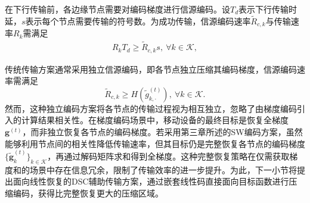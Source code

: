 在下行传输前，各边缘节点需要对编码梯度进行信源编码。设$T_d$表示下行传输时延，$s$表示每个节点需要传输的符号数。为成功传输，信源编码速率$\tilde{R}_{c,k}$与传输速率$R_k$需满足
\begin{align}
	R_kT_d\geq\tilde{R}_{c,k} s,~\forall k\in\mathcal{K} \label{rt>l},
\end{align}

传统传输方案通常采用独立信源编码，即各节点独立压缩其编码梯度，信源编码速率需满足
\begin{equation}
	\tilde{R}_{c,k}\geq H(\tilde{g}_{k,\cdot}^{(t)}),~\forall k\in \mathcal{K}.
\end{equation}
然而，这种独立编码方案将各节点的传输过程视为相互独立，忽略了由梯度编码引入的计算结果相关性。在梯度编码场景中，移动设备的最终目标是恢复全梯度$\mathbf{g}^{(t)}$，而非独立恢复各节点的编码梯度。若采用第三章所述的SW编码方案，虽然能够利用节点间的相关性降低传输速率，但其目标仍是完整恢复各节点的编码梯度$\{\tilde{\mathbf{g}}_k^{(t)}\}_{k\in\mathcal{K}}$，再通过解码矩阵求和得到全梯度。这种完整恢复策略在仅需获取梯度和的场景中存在信息冗余，限制了传输效率的进一步提升。为此，下一小节将提出面向线性恢复的DSC辅助传输方案，通过嵌套线性码直接面向目标函数进行压缩编码，获得比完整恢复更大的压缩区域。


